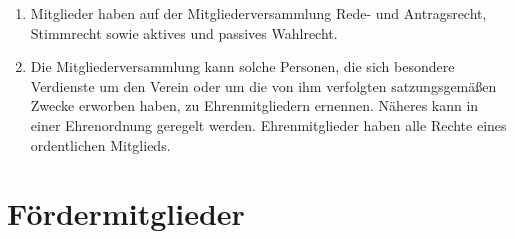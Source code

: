 \documentclass[10pt,conference,a4paper,nofonttune]{IEEEtran}
\begin{document}
\begin{enumerate}
  \item Mitglieder haben auf der Mitgliederversammlung Rede- und Antragsrecht,
    Stimmrecht sowie aktives und passives Wahlrecht.

  \item Die Mitgliederversammlung kann solche Personen, die sich besondere
    Verdienste um den Verein oder um die von ihm verfolgten satzungsgemäßen
    Zwecke erworben haben, zu Ehrenmitgliedern ernennen. Näheres kann in einer
    Ehrenordnung geregelt werden. Ehrenmitglieder haben alle Rechte eines
    ordentlichen Mitglieds.
\end{enumerate}


\section{Fördermitglieder}
\end{document}
